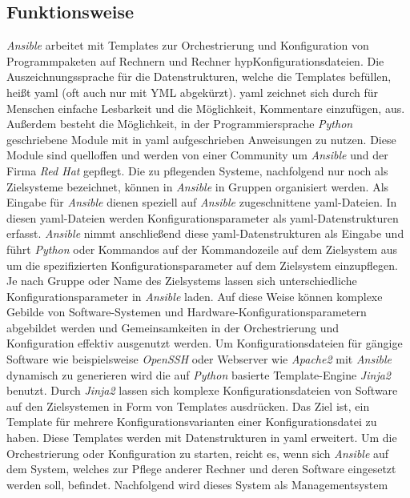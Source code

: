 \documentclass[titlepage]{report}
\begin{document}
\subsection*{Funktionsweise}
\emph{Ansible} arbeitet mit Templates zur Orchestrierung und
Konfiguration von Programmpaketen auf Rechnern und Rechner
hyp{}Konfigurationsdateien. Die Auszeichnungssprache für die
Datenstrukturen, welche die Templates befüllen, heißt \gls{yaml} (oft
auch nur mit YML abgekürzt). \gls{yaml} zeichnet sich durch für Menschen
einfache Lesbarkeit und die Möglichkeit, Kommentare einzufügen,
aus\cite{YAML_WIKI}. Außerdem besteht die Möglichkeit, in der
Programmiersprache \emph{Python} geschriebene Module mit in \gls{yaml}
aufgeschrieben Anweisungen zu nutzen. Diese Module sind quelloffen und
werden von einer Community um \emph{Ansible} und der Firma \emph{Red
Hat} gepflegt. Die zu pflegenden Systeme, nachfolgend nur noch als
Zielsysteme bezeichnet, können in \emph{Ansible} in Gruppen 
organisiert werden.
Als Eingabe für \emph{Ansible} dienen speziell auf \emph{Ansible}
zugeschnittene \gls{yaml}\hyp{}Dateien. In diesen
\gls{yaml}\hyp{}Dateien werden Konfigurationsparameter als
\gls{yaml}\hyp{}Datenstrukturen erfasst. \emph{Ansible} nimmt
anschließend diese \gls{yaml}\hyp{}Datenstrukturen als Eingabe und führt
\emph{Python} oder Kommandos auf der Kommandozeile auf dem Zielsystem aus um die spezifizierten
Konfigurationsparameter auf dem Zielsystem einzupflegen. Je nach Gruppe oder
Name des Zielsystems lassen sich unterschiedliche
Konfigurationsparameter in \emph{Ansible} laden.
Auf diese Weise können komplexe Gebilde von Software\hyp{}Systemen und
Hardware\hyp{}Konfigurationsparametern abgebildet werden
und Gemeinsamkeiten in der Orchestrierung und Konfiguration effektiv ausgenutzt werden.
Um Konfigurationsdateien für gängige Software wie beispielsweise
\emph{OpenSSH} oder Webserver wie \emph{Apache2} mit \emph{Ansible}
dynamisch zu generieren wird die auf \emph{Python} basierte Template\hyp{}Engine
\emph{Jinja2} benutzt\cite{JINJA2}. Durch \emph{Jinja2} lassen sich komplexe
Konfigurationsdateien von Software auf den Zielsystemen in Form von Templates
ausdrücken. Das Ziel ist, ein Template für mehrere
Konfigurationsvarianten einer Konfigurationsdatei zu haben. Diese
Templates werden mit Datenstrukturen in \gls{yaml} erweitert.
Um die Orchestrierung oder Konfiguration zu starten, reicht es, wenn sich
\emph{Ansible} auf dem System, welches zur Pflege anderer Rechner und
deren Software eingesetzt werden
soll, befindet. Nachfolgend wird dieses System als Managementsystem
\end{document}
